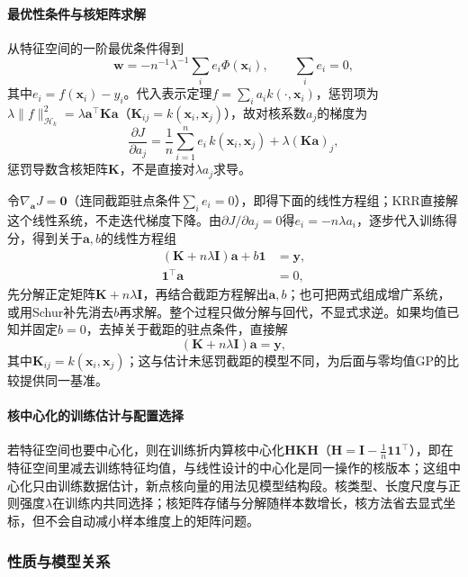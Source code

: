 \paragraph{最优性条件与核矩阵求解}

从特征空间的一阶最优条件得到
\[
  \bm{w}=-n^{-1}\lambda^{-1}\sum_i e_i\Phi(\bm{x}_i),\qquad \sum_i e_i=0,
\]
其中$e_i=f(\bm{x}_i)-y_i$。代入表示定理$f=\sum_i a_i k(\cdot,\bm{x}_i)$，惩罚项为$\lambda\lVert f\rVert^2_{\mathcal H_k}=\lambda\bm{a}^{\top}\bm{K}\bm{a}$（$\bm{K}_{ij}=k(\bm{x}_i,\bm{x}_j)$），故对核系数$a_j$的梯度为
\begin{equation}
  \frac{\partial J}{\partial a_j}
  =\frac1n\sum_{i=1}^{n}e_i\,k(\bm{x}_i,\bm{x}_j)+\lambda(\bm{K}\bm{a})_j,
  \label{eq:regression-krr-grad-a}
\end{equation}
惩罚导数含核矩阵$\bm{K}$，不是直接对$\lambda a_j$求导。

令$\nabla_{\bm a}J=\bm 0$（连同截距驻点条件$\sum_i e_i=0$），即得下面的线性方程组；KRR直接解这个线性系统，不走迭代梯度下降。由$\partial J/\partial a_j=0$得$e_i=-n\lambda a_i$，逐步代入训练得分，得到关于$\bm{a},b$的线性方程组
\[
  \begin{aligned}
    (\bm{K}+n\lambda\bm{I})\bm{a}+b\bm{1}&=\bm{y},\\
    \bm{1}^{\top}\bm{a}&=0,
  \end{aligned}
\]
先分解正定矩阵$\bm{K}+n\lambda\bm{I}$，再结合截距方程解出$\bm{a},b$；也可把两式组成增广系统，或用Schur补先消去$b$再求解。整个过程只做分解与回代，不显式求逆。如果均值已知并固定$b=0$，去掉关于截距的驻点条件，直接解
\begin{equation}
  (\bm{K}+n\lambda\bm{I})\bm{a}=\bm{y},
  \label{eq:regression-krr-dual}
\end{equation}
其中$\bm{K}_{ij}=k(\bm{x}_i,\bm{x}_j)$；这与估计未惩罚截距的模型不同，为后面与零均值GP的比较提供同一基准。

\paragraph{核中心化的训练估计与配置选择}

若特征空间也要中心化，则在训练折内算核中心化$\bm{H}\bm{K}\bm{H}$（$\bm{H}=\bm{I}-\frac1n\mathbf{1}\mathbf{1}^{\top}$），即在特征空间里减去训练特征均值，与线性设计的中心化是同一操作的核版本；这组中心化只由训练数据估计，新点核向量的用法见模型结构段。核类型、长度尺度与正则强度$\lambda$在训练内共同选择；核矩阵存储与分解随样本数增长，核方法省去显式坐标，但不会自动减小样本维度上的矩阵问题。

\subsubsection{性质与模型关系}
\label{sec:regression-krr-theory}

